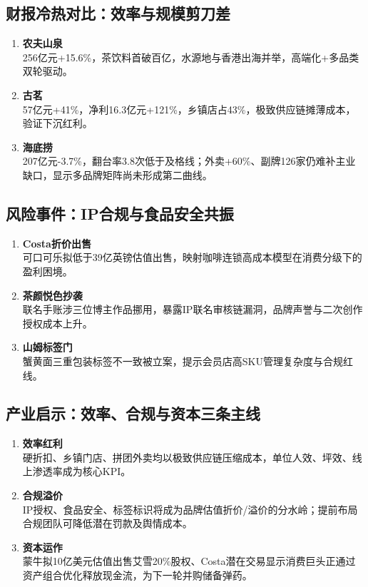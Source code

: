 \subsection{财报冷热对比：效率与规模剪刀差}
\begin{enumerate}[leftmargin=*, nosep]
    \item \textbf{农夫山泉}  \\
    256亿元+15.6\%，茶饮料首破百亿，水源地与香港出海并举，高端化+多品类双轮驱动。
    \item \textbf{古茗}  \\
    57亿元+41\%，净利16.3亿元+121\%，乡镇店占43\%，极致供应链摊薄成本，验证下沉红利。
    \item \textbf{海底捞}  \\
    207亿元-3.7\%，翻台率3.8次低于及格线；外卖+60\%、副牌126家仍难补主业缺口，显示多品牌矩阵尚未形成第二曲线。
\end{enumerate}

\subsection{风险事件：IP合规与食品安全共振}
\begin{enumerate}[leftmargin=*, nosep]
    \item \textbf{Costa折价出售}  \\
    可口可乐拟低于39亿英镑估值出售，映射咖啡连锁高成本模型在消费分级下的盈利困境。
    \item \textbf{茶颜悦色抄袭}  \\
    联名手账涉三位博主作品挪用，暴露IP联名审核链漏洞，品牌声誉与二次创作授权成本上升。
    \item \textbf{山姆标签门}  \\
    蟹黄面三重包装标签不一致被立案，提示会员店高SKU管理复杂度与合规红线。
\end{enumerate}

\subsection{产业启示：效率、合规与资本三条主线}
\begin{enumerate}[leftmargin=*, nosep]
    \item \textbf{效率红利}  \\
    硬折扣、乡镇门店、拼团外卖均以极致供应链压缩成本，单位人效、坪效、线上渗透率成为核心KPI。
    \item \textbf{合规溢价}  \\
    IP授权、食品安全、标签标识将成为品牌估值折价/溢价的分水岭；提前布局合规团队可降低潜在罚款及舆情成本。
    \item \textbf{资本运作}  \\
    蒙牛拟10亿美元估值出售艾雪20\%股权、Costa潜在交易显示消费巨头正通过资产组合优化释放现金流，为下一轮并购储备弹药。
\end{enumerate}


